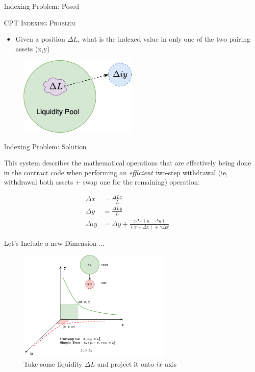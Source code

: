 \documentclass[10pt,xcolor=svgnames]{beamer} %
\begin{document}
\begin{frame}{Indexing Problem: Posed} 

\begin{exampleblock}{\textsc{CPT Indexing Problem}}
\begin{itemize}
  \item Given a position $\Delta L$, what is the indexed value in only one of the two pairing assets (x,y)
\end{itemize}
\end{exampleblock}

\begin{figure}[h!]
\includegraphics[width=2.3in]{img/indexed_tkn_lrg.png}
\label{fig:uniswap_v3}
\end{figure}



\end{frame}


\begin{frame}{Indexing Problem: Solution} 

This system describes the mathematical operations that are effectively being done in the contract code when performing an \textit{efficient} two-step withdrawal (ie, withdrawal both assets + swap one for the remaining) operation: 

\begin{align}
\Delta x &=\frac{\Delta L x}{L}\\
\Delta y &=\frac{\Delta L y}{L}\\
\Delta iy &= \Delta y + \frac{\gamma \Delta x (y - \Delta y)}{(x - \Delta x) + \gamma \Delta x}
\end{align}

\end{frame}


\begin{frame}{Let's Include a new Dimension ...} 
 
\begin{figure}[h!]
\includegraphics[width=3in]{img/simple_tree.png}
\caption{Take some liquidity $\Delta L$ and project it onto $ix$ axis} 
\label{fig:simple_tree}
\end{figure}

\end{frame}
\end{document}
